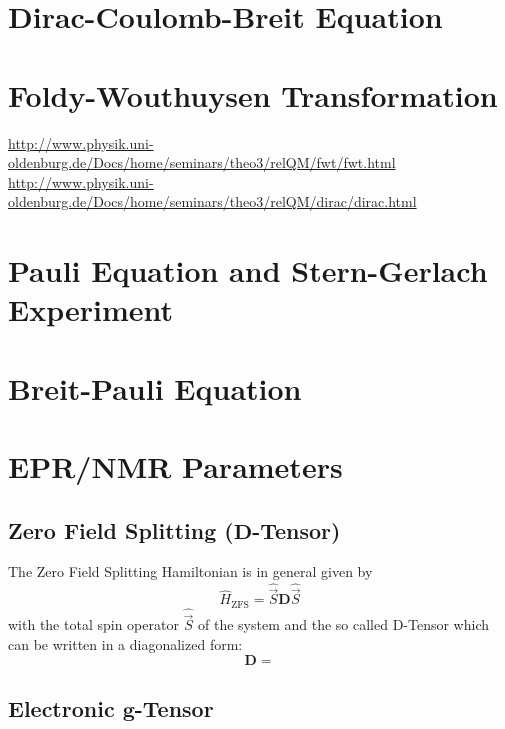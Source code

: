 \documentclass[9pt]{report}
\begin{document}
\section{Dirac-Coulomb-Breit Equation}




\section{Foldy-Wouthuysen Transformation}
\url{http://www.physik.uni-oldenburg.de/Docs/home/seminars/theo3/relQM/fwt/fwt.html}\\
\url{http://www.physik.uni-oldenburg.de/Docs/home/seminars/theo3/relQM/dirac/dirac.html}




\section{Pauli Equation and Stern-Gerlach Experiment}





\section{Breit-Pauli Equation}






\section{EPR/NMR Parameters}

\subsection{Zero Field Splitting ($\boldsymbol{D}$-Tensor)}
The Zero Field Splitting Hamiltonian is in general given by
\begin{equation}
\hat{H}_{\mathrm{ZFS}}=\hat{\vec{S}}\boldsymbol{D}\hat{\vec{S}}
\end{equation}
with the total spin operator $\hat{\vec{S}}$ of the system and the so called D-Tensor which can be written in a diagonalized form:
\begin{equation}
\boldsymbol{D}=
\end{equation}






\subsection{Electronic $\boldsymbol{g}$-Tensor}
\end{document}
